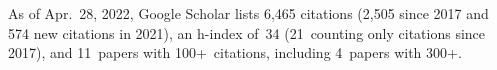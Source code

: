 %
As of Apr.~28, 2022, Google Scholar lists
6,465 citations (2,505 since 2017 and 574 new citations in 2021),
an h-index of~34 (21~counting only citations since 2017),
and 11~papers with 100+~citations, including 4~papers with 300+.
